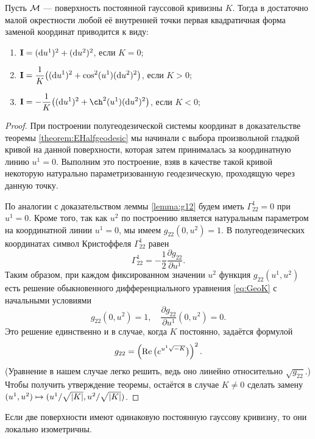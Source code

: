 \begin{theorem}
	Пусть $\mathcal{M}$ --- поверхность постоянной гауссовой кривизны $K$. Тогда в достаточно малой окрестности любой её внутренней точки первая квадратичная форма заменой координат приводится к виду:
	\begin{enumerate}[nolistsep, label=(\arabic*)]
		\item $\boldsymbol{\operatorname{I}} = (\mathop{}\!\mathrm{d} u^1)^2 + (\mathop{}\!\mathrm{d} u^2)^2$, если $K = 0$;
		\item $\displaystyle\boldsymbol{\operatorname{I}} = \frac{1}{K}\big((\mathop{}\!\mathrm{d} u^1)^2 + \cos^2(u^1)(\mathop{}\!\mathrm{d} u^2)^2\big)$, если $K > 0$;
		\item $\ds\I = -\frac{1}{K}\big((\d u^1)^2 + \ch^2(u^1)(\d u^2)^2\big)$, если $K < 0$;
	\end{enumerate}
\end{theorem}

\begin{proof}
	При построении полугеодезической системы координат в доказательстве теоремы \ref{theorem:EHalfgeodesic} мы начинали с выбора произвольной гладкой кривой на данной поверхности, которая затем принималась за координатную линию $u^1 = 0$. Выполним это построение, взяв в качестве такой кривой некоторую натурально параметризованную геодезическую, проходящую через данную точку.

	По аналогии с доказательством леммы \ref{lemma:g12} будем иметь $\Gamma_{22}^1 = 0$ при $u^1 = 0$. Кроме того, так как $u^2$ по построению является натуральным параметром на координатной линии $u^1 = 0$, мы имеем $g_{22}(0, u^2) = 1$. В полугеодезических координатах символ Кристоффеля $\Gamma_{22}^1$ равен
	\[
		\Gamma_{22}^1 = -\frac{1}{2}\frac{\partial g_{22}}{\partial u^1}.
	\]
	Таким образом, при каждом фиксированном значении $u^2$ функция $g_{22}(u^1, u^2)$ есть решение обыкновенного дифференциального уравнения \eqref{eq:GeoK} с начальными условиями
	\[
		g_{22}(0, u^2) = 1,\quad\frac{\partial g_{22}}{\partial u^1}(0, u^2) = 0.
	\]
	Это решение единственно и в случае, когда $K$ постоянно, задаётся формулой
	\[
		g_{22} = \left(\operatorname{Re}\big(e^{u^1\sqrt{-K}}\big)\right)^2.
	\]
	(Уравнение в нашем случае легко решить, ведь оно линейно относительно $\sqrt{g_{22}}$.) Чтобы получить утверждение теоремы, остаётся в случае $K \ne 0$ сделать замену $(u^1, u^2) \hm\mapsto (u^1 / \sqrt{\abs{K}}, u^2 / \sqrt{\abs{K}})$.
\end{proof}

\begin{corollary}
	Если две поверхности имеют одинаковую постоянную гауссову кривизну, то они локально изометричны.
\end{corollary}

